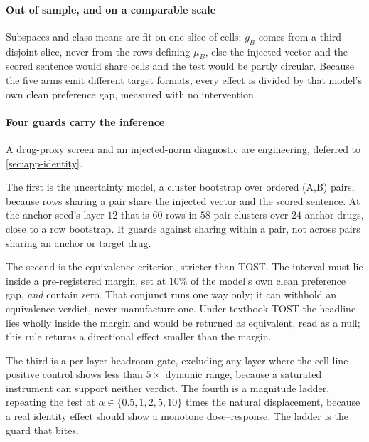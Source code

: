 \paragraph{Out of sample, and on a comparable scale} Subspaces and class means are
fit on one slice of cells; $g_B$ comes from a third disjoint slice, never from
the rows defining $\mu_B$, else the injected vector and the scored sentence would
share cells and the test would be partly circular. Because the five arms emit
different target formats, every effect is divided by that model's own clean
preference gap, measured with no intervention.

\paragraph{Four guards carry the inference} A drug-proxy screen and an
injected-norm diagnostic are engineering, deferred to \cref{sec:app-identity}.

The first is the uncertainty model, a cluster bootstrap over ordered (A,B) pairs,
because rows sharing a pair share the injected vector and the scored sentence. At
the anchor seed's layer $12$ that is $60$ rows in $58$ pair clusters over $24$
anchor drugs, close to a row bootstrap. It guards against sharing within a pair,
not across pairs sharing an anchor or target drug.

The second is the equivalence criterion, stricter than TOST. The interval must
lie inside a pre-registered margin, set at $10\%$ of the model's own clean
preference gap, \emph{and} contain zero. That conjunct runs one way only; it can
withhold an equivalence verdict, never manufacture one. Under textbook TOST the
headline  lies wholly inside the margin and would
be returned as equivalent, read as a null; this rule returns a directional effect
smaller than the margin.

The third is a per-layer headroom gate, excluding any layer where the cell-line
positive control shows less than $5\times$ dynamic range, because a saturated
instrument can support neither verdict. The fourth is a magnitude ladder,
repeating the test at $\alpha \in \{0.5, 1, 2, 5, 10\}$ times the natural
displacement, because a real identity effect should show a monotone
dose--response. The ladder is the guard that bites.

